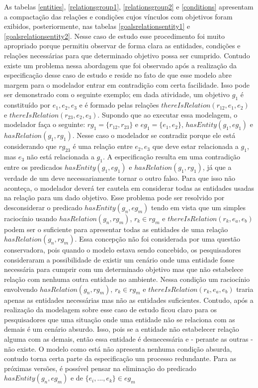 As tabelas \ref{entities}, \ref{relationsgroup1}, \ref{relationsgroup2} e \ref{conditions} apresentam a compactação das relações e condições cujos vínculos com objetivos foram exibidos, posteriormente, nas tabelas \ref{goalsrelationsentity1} e \ref{goalsrelationsentity2}. Nesse caso de estudo esse procedimento foi muito apropriado porque permitiu observar de forma clara as entidades, condições e relações necessárias para que determinado objetivo possa ser cumprido. Contudo existe um problema nessa abordagem que foi observado após a realização da especificação desse caso de estudo e reside no fato de que esse modelo abre margem para o modelador entrar em contradição com certa facilidade. Isso pode ser demonstrado com o seguinte exemplo; em dada atividade, um objetivo $g_1$ é constituído por $e_1,e_2,e_3$ e é formado pelas relações $thereIsRelation(r_{12},e_1,e_2)$ e $thereIsRelation(r_{23},e_2,e_3)$. Supondo que ao executar essa modelagem, o modelador faça o seguinte: $rg_1 = \{ r_{12},r_{23} \}$ e $ eg_1 = \{ e_1, e_2 \} $, $ hasEntity(g_1,eg_1) $ e $ hasRelation(g_1, rg_1) $. Nesse caso o modelador se contradiz porque ele está considerando que $rg_{23}$ é uma relação entre $e_2, e_3$ que deve estar relacionada a $g_1$, mas $e_3$ não está relacionada a $g_1$. A especificação resulta em uma contradição entre os predicados $ hasEntity(g_1,eg_1) $ e $ hasRelation(g_1, rg_1) $, já que a verdade de um deve necessariamente tornar o outro falso. Para que isso não aconteça, o modelador deverá ter cautela em considerar todas as entidades usadas na relação para um dado objetivo. Esse problema pode ser resolvido por desconsiderar o predicado $hasEntity(g_n,eg_m)$ tendo em vista que um simples raciocínio usando $hasRelation(g_n,rg_m)$, $r_k \in rg_m$ e $thereIsRelation(r_k, e_a,e_b)$ podem ser o suficiente para apresentar todas as entidades de uma relação $ hasRelation(g_n, rg_m) $. Essa concepção não foi considerada por uma questão conservadora, pois quando o modelo estava sendo concebido, os pesquisadores consideraram a possibilidade de existir um cenário onde uma entidade fosse necessária para cumprir com um determinado objetivo mas que não estabelece relação com nenhuma outra entidade no ambiente. Nessa condição um raciocínio envolvendo $hasRelation(g_n,rg_m)$, $r_k \in rg_m$ e $thereIsRelation(r_k, e_a,e_b)$ traria apenas as entidades necessárias 
mas não as entidades suficientes. Contudo, após a realização da modelagem sobre esse caso de estudo ficou claro para os pesquisadores que uma situação onde uma entidade não se relaciona com as demais é um cenário absurdo. Isso, pois se a entidade não estabelecer relação alguma com as demais, então essa entidade é desnecessária e - perante as outras - não existe. O modelo como está não apresenta nenhuma condição absurda, contudo torna certa parte da especificação um processo redundante. Para as próximas versões, é possível pensar na eliminação do predicado 
$ hasEntity(g_n,eg_m) $ e de $ \{ e_i , ... , e_k \} \in eg_m $

